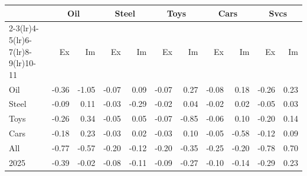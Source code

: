 \begin{tabular}{lrrrrrrrrrr}
\toprule
 & \multicolumn{2}{c}{Oil} & \multicolumn{2}{c}{Steel} & \multicolumn{2}{c}{Toys} & \multicolumn{2}{c}{Cars} & \multicolumn{2}{c}{Svcs} \\
\cmidrule(lr){2-3}\cmidrule(lr){4-5}\cmidrule(lr){6-7}\cmidrule(lr){8-9}\cmidrule(lr){10-11}
 & Ex & Im & Ex & Im & Ex & Im & Ex & Im & Ex & Im \\
\midrule
Oil & -0.36 & -1.05 & -0.07 & 0.09 & -0.07 & 0.27 & -0.08 & 0.18 & -0.26 & 0.23 \\
Steel & -0.09 & 0.11 & -0.03 & -0.29 & -0.02 & 0.04 & -0.02 & 0.02 & -0.05 & 0.03 \\
Toys & -0.26 & 0.34 & -0.05 & 0.05 & -0.07 & -0.85 & -0.06 & 0.10 & -0.20 & 0.14 \\
Cars & -0.18 & 0.23 & -0.03 & 0.02 & -0.03 & 0.10 & -0.05 & -0.58 & -0.12 & 0.09 \\
All & -0.77 & -0.57 & -0.20 & -0.12 & -0.20 & -0.35 & -0.25 & -0.20 & -0.78 & 0.70 \\
2025 & -0.39 & -0.02 & -0.08 & -0.11 & -0.09 & -0.27 & -0.10 & -0.14 & -0.29 & 0.23 \\
\bottomrule
\end{tabular}
